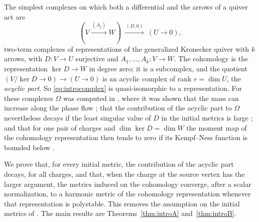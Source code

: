 The simplest complexes on which both a differential and the arrows of a
quiver act are
\begin{equation}\label{eq:introcomplex}
 (V\xrightarrow{\,(A_j)\,}W)\ \xrightarrow{\,(D,0)\,}\ (U\to0),
\end{equation}
two-term complexes of representations of the generalized Kronecker quiver
with $k$ arrows, with $D:V\to U$ surjective and $A_1,\dots,A_k:V\to W$. The
cohomology is the representation $\ker D\to W$ in degree zero; it is a
subcomplex, and the quotient $(V/\ker D\to0)\to(U\to0)$ is an acyclic complex
of rank $r=\dim U$, the \emph{acyclic part}. So \eqref{eq:introcomplex} is
quasi-isomorphic to a representation. For these complexes $\Omega$ was
computed in \cite{wue26}, where it was shown that the mass can increase along
the phase flow \cite[Theorem~1.1]{wue26}; that the contribution of the
acyclic part to $\Omega$ nevertheless decays if the least singular
value of $D$ in the initial metrics is large \cite[Theorem~1.3]{wue26}; and
that for one pair of charges and $\dim\ker D=\dim W$ the moment map of the
cohomology representation then tends to zero if its Kempf--Ness function is
bounded below \cite[Theorem~1.4]{wue26}.

We prove that, for every initial metric, the contribution of the acyclic
part decays, for all charges, and that, when the charge at the source vertex
has the larger argument, the metrics induced on the cohomology converge,
after a scalar normalization, to a harmonic metric of the cohomology
representation whenever that representation is polystable. This
removes the assumption on the initial metrics of
\cite[Theorems~1.3,~1.4]{wue26}. The main results are
Theorems~\ref{thm:introA} and~\ref{thm:introB}.

